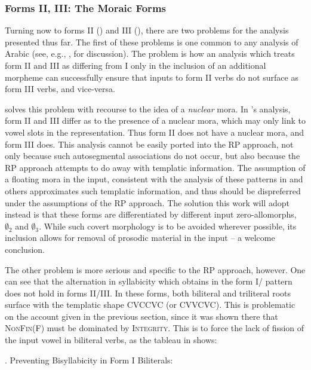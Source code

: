 \documentclass[12pt,twoside,letterpaper]{article}
\begin{document}
\subsubsection{Forms II, III: The Moraic Forms}
\label{sec:forms-ii-iii}

Turning now to forms II ({\em {}}) and III ({\em {}}), there are two problems for the analysis presented thus far. The first of these problems is one common to any analysis of Arabic (see, e.g., \cite{moore90}, \cite[ch.6]{ussishkin00} for discussion). The problem is how an analysis which treats form II and III as differing from I only in the inclusion of an additional morpheme can successfully ensure that inputs to form II verbs do not surface as form III verbs, and vice-versa.

\cite{moore90} solves this problem with recourse to the idea of a \emph{nuclear} mora. In \cite{moore90}'s analysis, form II and III differ as to the presence of a nuclear mora, which may only link to vowel slots in the representation. Thus form II does not have a nuclear mora, and form III does. This analysis cannot be easily ported into the RP approach, not only because such autosegmental associations do not occur, but also because the RP approach attempts to do away with templatic information. The assumption of a floating mora in the input, consistent with the analysis of these patterns in \cite{moore90} \cite[ch.6]{ussishkin00} and others approximates such templatic information, and thus should be dispreferred under the assumptions of the RP approach. The solution this work will adopt instead is that these forms are differentiated by different input zero-allomorphs, $\emptyset_2$ and $\emptyset_3$. While such covert morphology is to be avoided wherever possible, its inclusion allows for removal of prosodic material in the input -- a welcome conclusion.


The other problem is more serious and specific to the RP approach, however. One can see that the alternation in syllabicity which obtains in the form I/{\em {}} pattern does not hold in forms II/III. In these forms, both biliteral and triliteral roots surface with the templatic shape CVCCVC (or CVVCVC). This is problematic on the account given in the previous section, since it was shown there that \textsc{NonFin}(F) must be dominated by \textsc{Integrity}. This is to force the lack of fission of the input vowel in biliteral {\em {}} verbs, as the tableau in \Next shows:

\ex. Preventing Bisyllabicity in Form I Biliterals:\\\begin{OTtableau}{2}
  \OTcandrow*[\OThand]{[(marr)]}{ ,*}
  \OTcandrow*{[(marar)]}{*!, }
\end{OTtableau}
\end{document}
